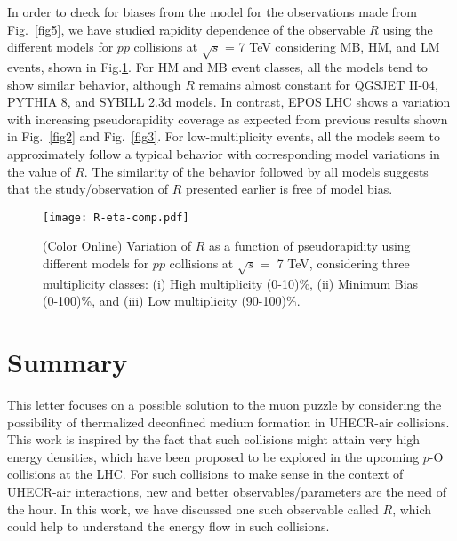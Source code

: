 \documentclass[aps,twocolumn,nofootinbib]{revtex4-1}
\begin{document}
In order to check for biases from the model for the observations made from Fig.~\ref{fig5}, we have studied rapidity dependence of the observable $R$ using the different models
for $pp$ collisions at $\sqrt{s}$ = 7 TeV considering MB, HM, and LM events, shown in Fig.\ref{fig6}. For HM and MB event classes, all the models tend to show similar behavior, although $R$ remains almost constant for QGSJET II-04, PYTHIA 8, and SYBILL 2.3d models. In contrast, EPOS LHC shows a variation with increasing pseudorapidity coverage as expected from previous results shown in Fig.~\ref{fig2} and Fig.~\ref{fig3}. For low-multiplicity events, all the models seem to approximately follow a typical behavior with corresponding model variations in the value of $R$. The similarity of the behavior followed by all models suggests that the study/observation of $R$ presented earlier is free of model bias.

\begin{figure}[ht!]
\texttt{[image: R-eta-comp.pdf]}
\caption{(Color Online) Variation of $R$ as a function of pseudorapidity using different models for $pp$ collisions at $\sqrt{s}=$ 7 TeV, considering three multiplicity classes: (i) High multiplicity (0-10)\%, (ii) Minimum Bias (0-100)\%, and (iii) Low multiplicity (90-100)\%.}
\label{fig6}
\end{figure}





\section{Summary}
\label{sum}
This letter focuses on a possible solution to the muon puzzle by considering the possibility of thermalized deconfined medium formation in UHECR-air collisions. This work is inspired by the fact that such collisions might attain very high energy densities, which have been proposed to be explored in the upcoming $p$-O collisions at the LHC. For such collisions to make sense in the context of UHECR-air interactions, new and better observables/parameters are the need of the hour. In this work, we have discussed one such observable called $R$, which could help to understand the energy flow in such collisions. \\
\end{document}

